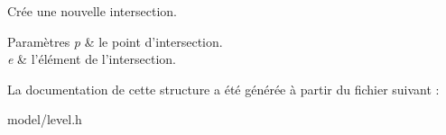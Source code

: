 Crée une nouvelle intersection. 


\begin{DoxyParams}{Paramètres}
{\em p} & le point d'intersection. \\
\hline
{\em e} & l'élément de l'intersection. \\
\hline
\end{DoxyParams}


La documentation de cette structure a été générée à partir du fichier suivant \+:\begin{DoxyCompactItemize}
\item 
model/level.\+h\end{DoxyCompactItemize}
